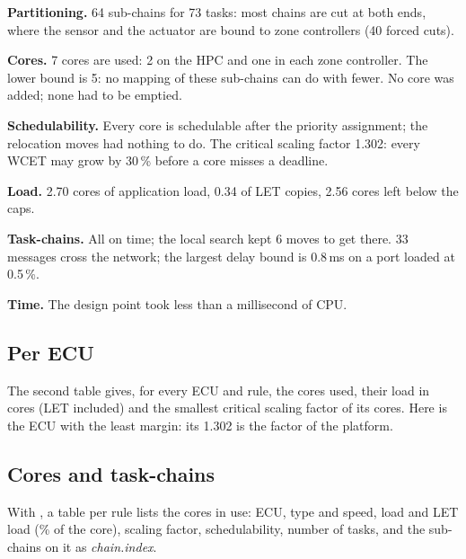 \begin{minipage}[t]{0.47\textwidth}
\vspace{0pt}
\end{minipage}\hfill
\begin{minipage}[t]{0.5\textwidth}
\vspace{0pt}\small
\textbf{Partitioning.} 64 sub-chains for 73 tasks: most chains are cut
at both ends, where the sensor and the actuator are bound to zone
controllers (40 forced cuts).

\textbf{Cores.} 7 cores are used: 2 on the HPC and one in each zone
controller. The lower bound is 5: no mapping of these sub-chains can do
with fewer. No core was added; none had to be emptied.

\textbf{Schedulability.} Every core is schedulable after the priority
assignment; the relocation moves had nothing to do. The critical
scaling factor 1.302: every WCET may grow by 30\,\% before a core misses
a deadline.

\textbf{Load.} 2.70 cores of application load, 0.34 of LET copies, 2.56
cores left below the caps.

\textbf{Task-chains.} All on time; the local search kept 6 moves to get
there. 33 messages cross the network; the largest delay bound is
0.8\,ms on a port loaded at 0.5\,\%.

\textbf{Time.} The design point took less than a millisecond of CPU.
\end{minipage}


\subsection{Per ECU}

The second table gives, for every ECU and rule, the cores used, their
load in cores (LET included) and the smallest critical scaling factor of
its cores. Here  is the ECU with the least margin: its 1.302
is the factor of the platform.


\subsection{Cores and task-chains}
\label{sec:cores-chains}

With , a table per rule lists the cores in use: ECU, type and
speed, load and LET load (\% of the core), scaling factor,
schedulability, number of tasks, and the sub-chains on it as
\emph{chain.index}.

